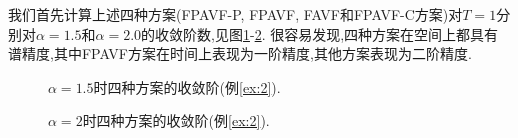 我们首先计算上述四种方案(FPAVF-P, FPAVF, FAVF和FPAVF-C方案)对$T=1$分别对$\alpha=1.5$和$\alpha=2.0$的收敛阶数,见图\ref{fig:1}-\ref{fig:2}.
很容易发现,四种方案在空间上都具有谱精度,其中FPAVF方案在时间上表现为一阶精度,其他方案表现为二阶精度.

\begin{figure}[H]
\begin{center}
\caption{$\alpha=1.5$时四种方案的收敛阶(例\ref{ex:2}).} \label{fig:1}
\end{center}
\end{figure}

\begin{figure}[H]
\begin{center}
\caption{$\alpha=2$时四种方案的收敛阶(例\ref{ex:2}).} \label{fig:2}
\end{center}
\end{figure}

